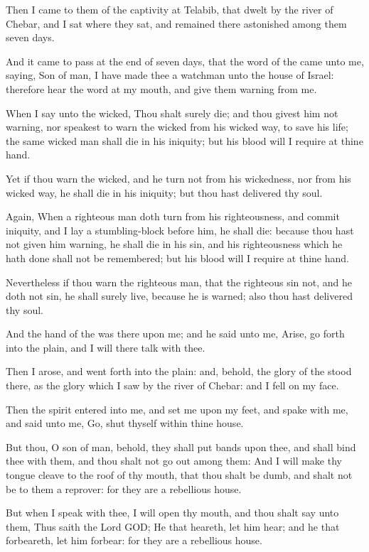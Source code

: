 \verse Then I came to them of the captivity at Telabib, that dwelt by the river of Chebar, and I sat where they sat, and remained there astonished among them seven days.

\verse And it came to pass at the end of seven days, that the word of the \LORD came unto me, saying, \verse Son of man, I have made thee a watchman unto the house of Israel: therefore hear the word at my mouth, and give them warning from me.

\verse When I say unto the wicked, Thou shalt surely die; and thou givest him not warning, nor speakest to warn the wicked from his wicked way, to save his life; the same wicked man shall die in his iniquity; but his blood will I require at thine hand.

\verse Yet if thou warn the wicked, and he turn not from his wickedness, nor from his wicked way, he shall die in his iniquity; but thou hast delivered thy soul.

\verse Again, When a righteous man doth turn from his righteousness, and commit iniquity, and I lay a stumbling-block before him, he shall die: because thou hast not given him warning, he shall die in his sin, and his righteousness which he hath done shall not be remembered; but his blood will I require at thine hand.

\verse Nevertheless if thou warn the righteous man, that the righteous sin not, and he doth not sin, he shall surely live, because he is warned; also thou hast delivered thy soul.

\verse And the hand of the \LORD was there upon me; and he said unto me, Arise, go forth into the plain, and I will there talk with thee.

\verse Then I arose, and went forth into the plain: and, behold, the glory of the \LORD stood there, as the glory which I saw by the river of Chebar: and I fell on my face.

\verse Then the spirit entered into me, and set me upon my feet, and spake with me, and said unto me, Go, shut thyself within thine house.

\verse But thou, O son of man, behold, they shall put bands upon thee, and shall bind thee with them, and thou shalt not go out among them: \verse And I will make thy tongue cleave to the roof of thy mouth, that thou shalt be dumb, and shalt not be to them a reprover: for they are a rebellious house.

\verse But when I speak with thee, I will open thy mouth, and thou shalt say unto them, Thus saith the Lord GOD; He that heareth, let him hear; and he that forbeareth, let him forbear: for they are a rebellious house.



